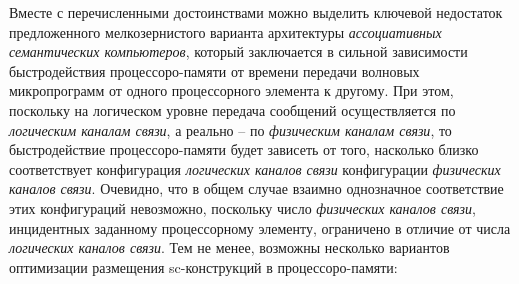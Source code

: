 Вместе с перечисленными достоинствами можно выделить ключевой недостаток предложенного мелкозернистого варианта архитектуры \textit{ассоциативных семантических компьютеров}, который заключается в сильной зависимости быстродействия процессоро-памяти от времени передачи волновых микропрограмм от одного процессорного элемента к другому. При этом, поскольку на логическом уровне передача сообщений осуществляется по \textit{логическим каналам связи}, а реально -- по \textit{физическим каналам связи}, то быстродействие процессоро-памяти будет зависеть от того, насколько близко соответствует конфигурация \textit{логических каналов связи} конфигурации \textit{физических каналов связи}. Очевидно, что в общем случае взаимно однозначное соответствие этих конфигураций невозможно, поскольку число \textit{физических каналов связи}, инцидентных заданному процессорному элементу, ограничено в отличие от числа \textit{логических каналов связи}. Тем не менее, возможны несколько вариантов оптимизации размещения sc-конструкций в процессоро-памяти:
